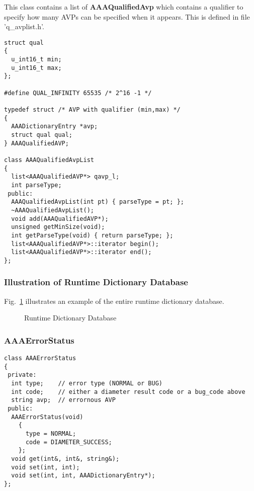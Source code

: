 This class contains a list of {\bf AAAQualifiedAvp} which contains a
qualifier to specify how many AVPs can be specified when it appears.
This is defined in file 'q\_avplist.h'.

\begin{verbatim}
struct qual
{
  u_int16_t min;
  u_int16_t max;
};

#define QUAL_INFINITY 65535 /* 2^16 -1 */

typedef struct /* AVP with qualifier (min,max) */
{
  AAADictionaryEntry *avp;
  struct qual qual;
} AAAQualifiedAVP;

class AAAQualifiedAvpList
{
  list<AAAQualifiedAVP*> qavp_l;
  int parseType;
 public:
  AAAQualifiedAvpList(int pt) { parseType = pt; };
  ~AAAQualifiedAvpList();
  void add(AAAQualifiedAVP*);
  unsigned getMinSize(void);
  int getParseType(void) { return parseType; };
  list<AAAQualifiedAVP*>::iterator begin();
  list<AAAQualifiedAVP*>::iterator end();
};
\end{verbatim}


\subsubsection{Illustration of Runtime Dictionary Database}

Fig.~\ref{fig:runtime-dictdb} illustrates 
an example of the entire runtime dictionary database.

\begin{figure}[htbp]
\begin{center}
\mbox{\epsfxsize=6in}
\caption{Runtime Dictionary Database\label{fig:runtime-dictdb}}
\end{center} 
\end{figure}
\clearpage

\subsubsection{AAAErrorStatus}

\begin{verbatim}
class AAAErrorStatus
{
 private:
  int type;    // error type (NORMAL or BUG)
  int code;    // either a diameter result code or a bug_code above
  string avp;  // errornous AVP
 public:
  AAAErrorStatus(void)
    {
      type = NORMAL;
      code = DIAMETER_SUCCESS;
    };
  void get(int&, int&, string&);
  void set(int, int);
  void set(int, int, AAADictionaryEntry*);
};
\end{verbatim}

